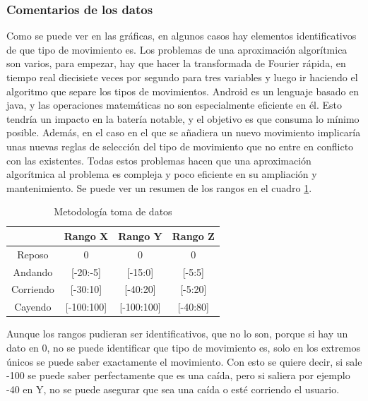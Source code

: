 \documentclass[12pt]{article}
\numberwithin{equation}{section}
\begin{document}
{\subsubsection{Comentarios de los datos}

Como se puede ver en las gráficas, en algunos casos hay elementos identificativos de que tipo de movimiento es. Los problemas de una aproximación algorítmica son varios, para empezar, hay que hacer la transformada de Fourier rápida, en tiempo real diecisiete veces por segundo para tres variables y luego ir haciendo el algoritmo que separe los tipos de movimientos. Android es un lenguaje basado en java, y las operaciones matemáticas no son especialmente eficiente en él. Esto tendría un impacto en la batería notable, y el objetivo es que consuma lo mínimo posible. Además, en el caso en el que se añadiera un nuevo movimiento implicaría unas nuevas reglas de selección del tipo de movimiento que no entre en conflicto con las existentes. Todas estos problemas hacen que una aproximación algorítmica al problema es compleja y poco eficiente en su ampliación y mantenimiento. Se puede ver un resumen de los rangos en el cuadro \ref{table1}.

\begin{center}
\begin{table}
\caption{Metodología toma de datos}
\begin{center}
\begin{tabular}{| c | c | c | c |}
\hline
 & Rango X & Rango Y & Rango Z \\
\hline
Reposo & 0 & 0 & 0\\
\hline
Andando & [-20:-5] & [-15:0] & [-5:5] \\
\hline
Corriendo & [-30:10] & [-40:20] & [-5:20] \\
\hline
Cayendo & [-100:100] & [-100:100] & [-40:80] \\
\hline
\end{tabular}
\end{center}
\label{table1}
\end{table}
\end{center}


Aunque los rangos pudieran ser identificativos, que no lo son, porque si hay un dato en 0, no se puede identificar que tipo de movimiento es, solo en los extremos únicos se puede saber exactamente el movimiento. Con esto se quiere decir, si sale -100 se puede saber perfectamente que es una caída, pero si saliera por ejemplo -40 en Y, no se puede asegurar que sea una caída o esté corriendo el usuario.

}
\end{document}
